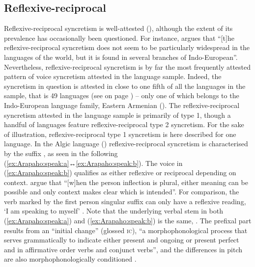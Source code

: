 \subsection{Reflexive-reciprocal} \label{sec:simple-syncretism:refl-recp}
Reflexive-reciprocal syncretism is well-attested (\citealt{geniusiene:1987, knjazev:1998, nedjalkov:2007a}), although the extent of its prevalence has occasionally been questioned. For instance, \citet[66]{creissels:2016} argues that “[t]he re\-flex\-ive-recipro\-cal syncretism does not seem to be particularly widespread in the languages of the world, but it is found in several branches of Indo-European”. Nevertheless, re\-flex\-ive-reciprocal syncretism is by far the most frequently attested pattern of voice syncretism attested in the language sample. Indeed, the syncretism in question is attested in close to one fifth of all the languages in the sample, that is 49 languages (see  on page \pageref{tab:ch6:voice-syncretism-simplex}) -- only one of which belongs to the Indo-European language family, Eastern Armenian (). The reflexive-reciprocal syncretism attested in the language sample is primarily of type 1, though a handful of languages feature reflexive-reciprocal type 2 syncretism. For the sake of illustration, reflexive-reciprocal type 1 syncretism is here described for one language. In the Algic language  () reflexive-reciprocal syncretism is characterised by the suffix , as seen in the following  (\ref{ex:Arapaho:speak:a}↔\ref{ex:Arapaho:speak:b}). The voice in (\ref{ex:Arapaho:speak:b}) qualifies as either reflexive or reciprocal depending on context. \citet[140]{cowell:moss:2008} argue that “[w]hen the person inflection is plural, either meaning can be possible and only context makes clear which is intended”. For comparison, the verb  marked by the first person singular suffix  can only have a reflexive reading, ‘I am speaking to myself’ \citep[139]{cowell:moss:2008}. Note that the underlying verbal stem in both (\ref{ex:Arapaho:speak:a}) and (\ref{ex:Arapaho:speak:b}) is the same, . The prefixal part  results from an “initial change” (glossed \textsc{ic}), “a morphophonological process that serves grammatically to indicate either present  and ongoing  or present perfect  and  in affirmative order verbs and conjunct  verbs”, and the differences in pitch are also morphophonologically conditioned \citep[22ff., 73]{cowell:moss:2008}.


